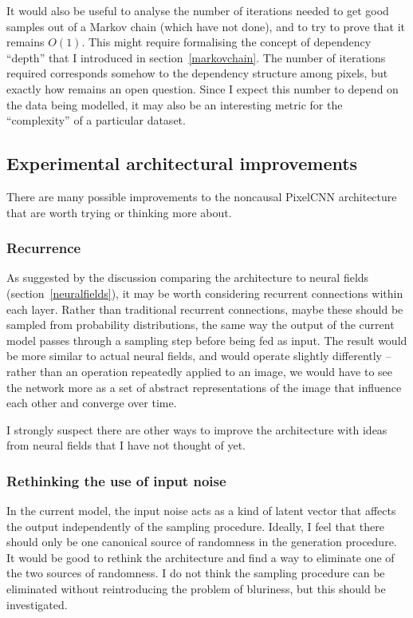 \documentclass[11pt, a4paper, openany]{book}
\newcommand{\nquote}[1]{``{#1}''}
\begin{document}
It would also be useful to analyse the number of iterations needed to get good samples out of a Markov chain (which \citet{gsn} have not done), and to try to prove that it remains $O(1)$. This might require formalising the concept of dependency \nquote{depth} that I introduced in section~\ref{markovchain}. The number of iterations required corresponds somehow to the dependency structure among pixels, but exactly how remains an open question. Since I expect this number to depend on the data being modelled, it may also be an interesting metric for the \nquote{complexity} of a particular dataset.

\subsection{Experimental architectural improvements}

There are many possible improvements to the noncausal PixelCNN architecture that are worth trying or thinking more about.

\subsubsection{Recurrence}

As suggested by the discussion comparing the architecture to neural fields (section~\ref{neuralfields}), it may be worth considering recurrent connections within each layer. Rather than traditional recurrent connections, maybe these should be sampled from probability distributions, the same way the output of the current model passes through a sampling step before being fed as input. The result would be more similar to actual neural fields, and would operate slightly differently -- rather than an operation repeatedly applied to an image, we would have to see the network more as a set of abstract representations of the image that influence each other and converge over time.

I strongly suspect there are other ways to improve the architecture with ideas from neural fields that I have not thought of yet.

\subsubsection{Rethinking the use of input noise}

In the current model, the input noise acts as a kind of latent vector that affects the output independently of the sampling procedure. Ideally, I feel that there should only be one canonical source of randomness in the generation procedure. It would be good to rethink the architecture and find a way to eliminate one of the two sources of randomness. I do not think the sampling procedure can be eliminated without reintroducing the problem of bluriness, but this should be investigated.
\end{document}
